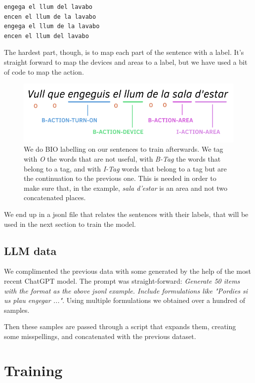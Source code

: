 \documentclass{article}
\begin{document}
\begin{verbatim}
engega el llum del lavabo
encen el llum de la lavabo
engega el llum de la lavabo
encen el llum del lavabo
\end{verbatim}

The hardest part, though, is to map each part of the sentence with a label. It's straight forward to map the devices and areas to a label, but we have used a bit of code to map the action.

\begin{figure}[H]
    \centering
    \includegraphics[width=0.75\linewidth]{bio_example.png}
    \caption{We do BIO labelling on our sentences to train afterwards. We tag with \textit{O} the words that are not useful, with \textit{B-Tag} the words that belong to a tag, and with \textit{I-Tag} words that belong to a tag but are the continuation to the previous one. This is needed in order to make sure that, in the example, \textit{sala d'estar} is an area and not two concatenated places.}
    \label{fig:bio-example}
\end{figure}

We end up in a jsonl file that relates the sentences with their labels, that will be used in the next section to train the model.

\subsection{LLM data}

We complimented the previous data with some generated by the help of the most recent ChatGPT model. The prompt was straight-forward: \textit{Generate 50 items with the format as the above jsonl example. Include formulations like "Pordies si us plau engegar ..."}. Using multiple formulations we obtained over a hundred of samples.

Then these samples are passed through a script that expands them, creating some misspellings, and concatenated with the previous dataset.

\section{Training}
\end{document}
